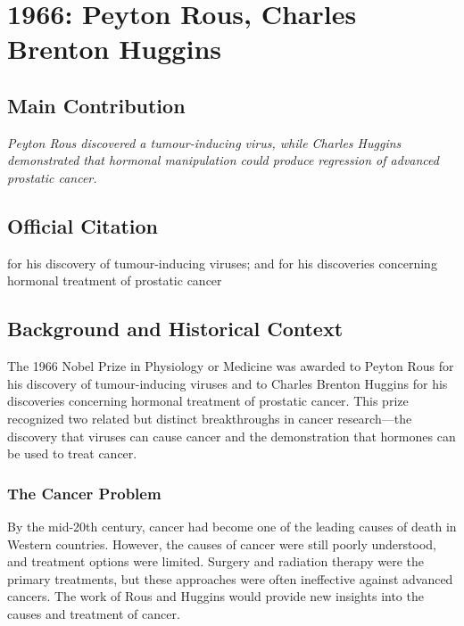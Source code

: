 \chapter[1966 --- Rous et al.]{1966: Peyton Rous, Charles Brenton Huggins}
\label{ch:1966_Rous}

\section*{Main Contribution}

\textit{Peyton Rous discovered a tumour-inducing virus, while Charles Huggins demonstrated that hormonal manipulation could produce regression of advanced prostatic cancer.}\cite{nobel-1966,lecture-1966,lecture-huggins-1966}

\section{Official Citation}

for his discovery of tumour-inducing viruses; and for his discoveries concerning hormonal treatment of prostatic cancer

\section{Background and Historical Context}

The 1966 Nobel Prize in Physiology or Medicine was awarded to Peyton Rous for his discovery of tumour-inducing viruses and to Charles Brenton Huggins for his discoveries concerning hormonal treatment of prostatic cancer. This prize recognized two related but distinct breakthroughs in cancer research---the discovery that viruses can cause cancer and the demonstration that hormones can be used to treat cancer.

\subsection{The Cancer Problem}

By the mid-20th century, cancer had become one of the leading causes of death in Western countries. However, the causes of cancer were still poorly understood, and treatment options were limited. Surgery and radiation therapy were the primary treatments, but these approaches were often ineffective against advanced cancers. The work of Rous and Huggins would provide new insights into the causes and treatment of cancer.

